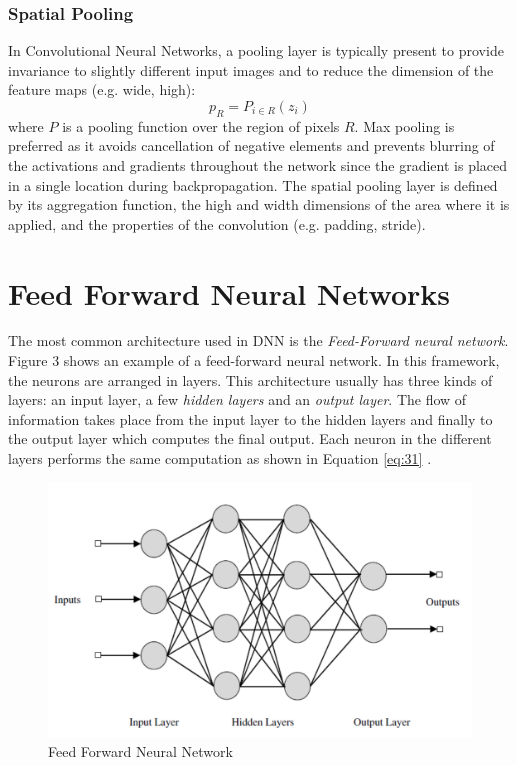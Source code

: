     \subsubsection{Spatial Pooling}
            In Convolutional Neural Networks, a pooling layer is typically present to provide invariance
        to slightly different input images and to reduce the dimension of the feature maps (e.g.
        wide, high):
        \begin{equation*}
        p_R=P_{i \in R}(z_i)            
        \end{equation*}
        where $P$ is a pooling function over the region of pixels $R$. Max pooling is preferred as
        it avoids cancellation of negative elements and prevents blurring of the activations and
        gradients throughout the network since the gradient is placed in a single location during
        backpropagation.
        The spatial pooling layer is defined by its aggregation function, the high and width dimensions of the area where it is applied, and the properties of the convolution (e.g. padding,
        stride).
        
\section{Feed Forward Neural Networks}
    The most common architecture used in DNN is the \textit{Feed-Forward neural network}. Figure
    3 shows an example of a feed-forward neural network. In this framework, the neurons are
    arranged in layers. This architecture usually has three kinds of layers: an input layer, a few
    \textit{hidden layers} and an \textit{output layer}. The flow of information takes place from the input layer
    to the hidden layers and finally to the output layer which computes the final output. Each
    neuron in the different layers performs the same computation as shown in Equation \ref{eq:31} .
    \begin{figure}[H]
        \centering
        \includegraphics[scale=0.3]{images/ffnn.png}
        \caption[Feed Forward Neural Network]{Feed Forward Neural Network \cite{ffnn}}
        \label{fig:33}
    \end{figure}
    
